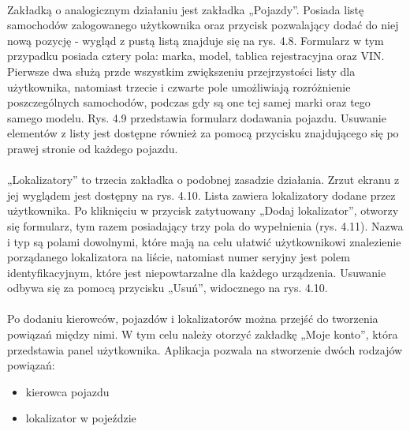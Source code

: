\paragraph{}
Zakładką o analogicznym działaniu jest zakładka „Pojazdy”. Posiada listę samochodów zalogowanego użytkownika oraz przycisk pozwalający dodać do niej nową pozycję - wygląd z pustą listą znajduje się na rys. 4.8. Formularz w tym przypadku posiada cztery pola: marka, model, tablica rejestracyjna oraz VIN. Pierwsze dwa służą przde wszystkim zwiększeniu przejrzystości listy dla użytkownika, natomiast trzecie i czwarte pole umożliwiają rozróżnienie poszczególnych samochodów, podczas gdy są one tej samej marki oraz tego samego modelu. Rys. 4.9 przedstawia formularz dodawania pojazdu. Usuwanie elementów z listy jest dostępne również za pomocą przycisku znajdującego się po prawej stronie od każdego pojazdu.

\paragraph{}
„Lokalizatory” to trzecia zakładka o podobnej zasadzie działania. Zrzut ekranu z jej wyglądem jest dostępny na rys. 4.10. Lista zawiera lokalizatory dodane przez użytkownika. Po kliknięciu w przycisk zatytuowany „Dodaj lokalizator”, otworzy się formularz, tym razem posiadający trzy pola do wypełnienia (rys. 4.11). Nazwa i typ są polami dowolnymi, które mają na celu ułatwić użytkownikowi znalezienie porządanego lokalizatora na liście, natomiast numer seryjny jest polem identyfikacyjnym, które jest niepowtarzalne dla każdego urządzenia. Usuwanie odbywa się za pomocą przycisku „Usuń”, widocznego na rys. 4.10.

\paragraph{}
Po dodaniu kierowców, pojazdów i lokalizatorów można przejść do tworzenia powiązań między nimi. W tym celu należy otorzyć zakładkę „Moje konto”, która przedstawia panel użytkownika. Aplikacja pozwala na stworzenie dwóch rodzajów powiązań:

\begin{itemize}
	\item kierowca pojazdu
	\item lokalizator w pojeździe
\end{itemize}

